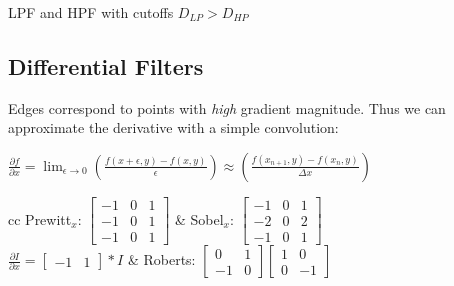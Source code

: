 \begin{definition}
  LPF and HPF with cutoffs \(D_{LP} > D_{HP}\)
\end{definition}

\subsection{Differential Filters}
Edges correspond to points with \textit{high} gradient magnitude. Thus we can approximate the derivative with a simple convolution:
\begin{center}
  \(\frac{\partial f}{\partial x} = \lim_{\epsilon \to 0}\left(\frac{f(x + \epsilon, y) - f(x, y)}{\epsilon}\right) \approx \left(\frac{f(x_{n+1}, y) - f(x_n, y)}{\varDelta x}\right)\)
\end{center}

\begin{tabularx}{\linewidth}{cc}
  Prewitt\(_x\): \(\begin{bmatrix}
    -1 & 0 & 1 \\
    -1 & 0 & 1 \\
    -1 & 0 & 1
  \end{bmatrix}\) & 
  Sobel\(_x\): \(\begin{bmatrix}
    -1 & 0 & 1 \\
    -2 & 0 & 2 \\
    -1 & 0 & 1
  \end{bmatrix}\) \\
  \(\frac{\partial I}{\partial x} = \begin{bmatrix}
    -1 & 1
  \end{bmatrix} \ast I\) &
  Roberts: \(\begin{bmatrix}
    0 & 1 \\
    -1 & 0
  \end{bmatrix} \begin{bmatrix}
    1 & 0 \\
    0 & -1
  \end{bmatrix}\)
\end{tabularx}

